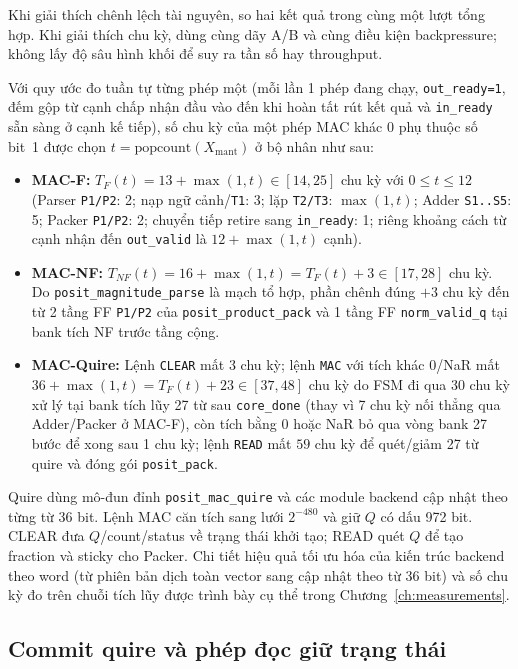  Khi giải thích
chênh lệch tài nguyên, so hai kết quả trong cùng một lượt
tổng hợp. Khi giải thích chu kỳ, dùng cùng dãy A/B và cùng
điều kiện backpressure; không lấy độ sâu hình khối để suy
ra tần số hay throughput.

Với quy ước đo tuần tự từng phép một (mỗi lần 1 phép đang chạy, \texttt{out\_ready=1}, đếm gộp từ cạnh chấp nhận đầu vào đến khi hoàn tất rút kết quả và \texttt{in\_ready} sẵn sàng ở cạnh kế tiếp), số chu kỳ của một phép MAC khác 0 phụ thuộc số bit~1 được chọn $t = \mathrm{popcount}(X_{\mathrm{mant}})$ ở bộ nhân như sau:
\begin{itemize}
\item \textbf{MAC-F:} $T_F(t) = 13 + \max(1,t) \in [14, 25]$ chu kỳ với $0 \le t \le 12$ (Parser \texttt{P1/P2}: 2; nạp ngữ cảnh/\texttt{T1}: 3; lặp \texttt{T2/T3}: $\max(1,t)$; Adder \texttt{S1..S5}: 5; Packer \texttt{P1/P2}: 2; chuyển tiếp retire sang \texttt{in\_ready}: 1; riêng khoảng cách từ cạnh nhận đến \texttt{out\_valid} là $12 + \max(1,t)$ cạnh).
\item \textbf{MAC-NF:} $T_{NF}(t) = 16 + \max(1,t) = T_F(t) + 3 \in [17, 28]$ chu kỳ. Do \texttt{posit\_magnitude\_parse} là mạch tổ hợp, phần chênh đúng $+3$ chu kỳ đến từ 2 tầng FF \texttt{P1/P2} của \texttt{posit\_product\_pack} và 1 tầng FF \texttt{norm\_valid\_q} tại bank tích NF trước tầng cộng.
\item \textbf{MAC-Quire:} Lệnh \texttt{CLEAR} mất $3$ chu kỳ; lệnh \texttt{MAC} với tích khác 0/NaR mất $36 + \max(1,t) = T_F(t) + 23 \in [37, 48]$ chu kỳ do FSM đi qua 30 chu kỳ xử lý tại bank tích lũy 27 từ sau \texttt{core\_done} (thay vì 7 chu kỳ nối thẳng qua Adder/Packer ở MAC-F), còn tích bằng 0 hoặc NaR bỏ qua vòng bank 27 bước để xong sau 1 chu kỳ; lệnh \texttt{READ} mất $59$ chu kỳ để quét/giảm 27 từ quire và đóng gói \texttt{posit\_pack}.
\end{itemize}

Quire dùng mô-đun đỉnh \texttt{posit\_mac\_quire} và các module backend
cập nhật theo từng từ 36 bit. Lệnh MAC căn tích
sang lưới $2^{-480}$ và giữ $Q$ có dấu 972 bit. CLEAR đưa
$Q$/count/status về trạng thái khởi tạo; READ quét $Q$ để
tạo fraction và sticky cho Packer. Chi tiết hiệu quả tối ưu hóa của kiến trúc
backend theo word (từ phiên bản dịch toàn vector sang cập nhật theo từ 36 bit)
và số chu kỳ đo trên chuỗi tích lũy được trình bày cụ thể trong Chương~\ref{ch:measurements}.



\subsection{Commit quire và phép đọc giữ trạng thái}

